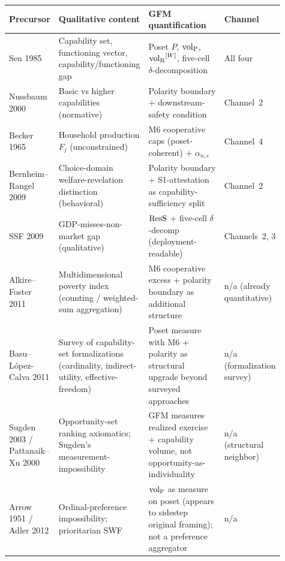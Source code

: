 \begin{table}[ht]
\centering
\footnotesize
\setlength{\tabcolsep}{4pt}
\begin{tabular}{>{\raggedright\arraybackslash}p{0.13\linewidth}
                >{\raggedright\arraybackslash}p{0.30\linewidth}
                >{\raggedright\arraybackslash}p{0.32\linewidth}
                >{\raggedright\arraybackslash}p{0.16\linewidth}}
\toprule
\textbf{Precursor} & \textbf{Qualitative content} &
\textbf{GFM quantification} & \textbf{Channel} \\
\midrule
Sen 1985 & Capability set, functioning vector, capability/functioning gap &
Poset $P$, ${\operatorname{vol}_{\mathrm{P}}}$, ${\operatorname{vol}_{\mathrm{R}}}^{[W]}$, five-cell $\delta$-decomposition &
All four \\
\addlinespace
Nussbaum 2000 & Basic vs higher capabilities (normative) &
Polarity boundary + downstream-safety condition &
Channel~2 \\
\addlinespace
Becker 1965 & Household production $F_j$ (unconstrained) &
M6 cooperative caps (poset-coherent) + $\alpha_{n,c}$ &
Channel~4 \\
\addlinespace
Bernheim--Rangel 2009 & Choice-domain welfare-revelation distinction (behavioral) &
Polarity boundary + S1-attestation as capability-sufficiency split &
Channel~2 \\
\addlinespace
SSF 2009 & GDP-misses-non-market gap (qualitative) &
$\mathrm{ResS}$ + five-cell $\delta$-decomp (deployment-readable) &
Channels~2, 3 \\
\addlinespace
Alkire--Foster 2011 & Multidimensional poverty index (counting / weighted-sum aggregation) &
M6 cooperative excess + polarity boundary as additional structure &
n/a (already quantitative) \\
\addlinespace
Basu--L\'opez-Calva 2011 & Survey of capability-set formalizations (cardinality, indirect-utility, effective-freedom) &
Poset measure with M6 + polarity as structural upgrade beyond surveyed approaches &
n/a (formalization survey) \\
\addlinespace
Sugden 2003 / Pattanaik--Xu 2000 & Opportunity-set ranking axiomatics; Sugden's measurement-impossibility &
GFM measures realized exercise + capability volume, not opportunity-as-individuality &
n/a (structural neighbor) \\
\addlinespace
Arrow 1951 / Adler 2012 & Ordinal-preference impossibility; prioritarian SWF &
${\operatorname{vol}_{\mathrm{P}}}$ as measure on poset (appears to sidestep original framing); not a preference aggregator &
n/a \\
\bottomrule
\end{tabular}

\end{table}
